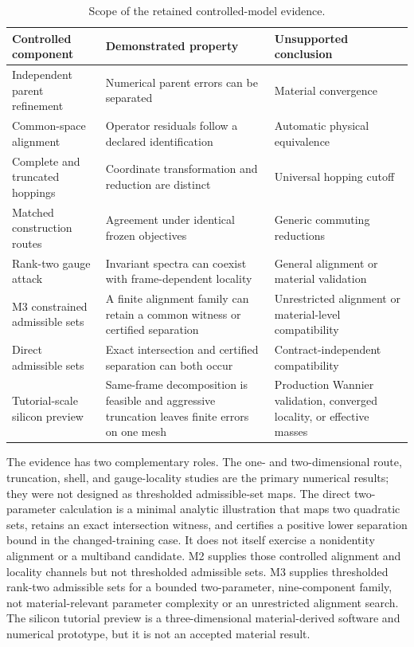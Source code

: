 \documentclass[preprint,12pt]{elsarticle}
\begin{document}
\begin{table}[t]
\centering
\caption{Scope of the retained controlled-model evidence.}
\label{tab:evidence-scope}
\begin{tabular}{@{}
>{\raggedright\arraybackslash}p{}
>{\raggedright\arraybackslash}p{}
>{\raggedright\arraybackslash}p{}@{}}
\toprule
Controlled component & Demonstrated property & Unsupported conclusion \\
\midrule
Independent parent refinement
& Numerical parent errors can be separated
& Material convergence \\
Common-space alignment
& Operator residuals follow a declared identification
& Automatic physical equivalence \\
Complete and truncated hoppings
& Coordinate transformation and reduction are distinct
& Universal hopping cutoff \\
Matched construction routes
& Agreement under identical frozen objectives
& Generic commuting reductions \\
Rank-two gauge attack
& Invariant spectra can coexist with frame-dependent locality
& General alignment or material validation \\
M3 constrained admissible sets
& A finite alignment family can retain a common witness or certified separation
& Unrestricted alignment or material-level compatibility \\
Direct admissible sets
& Exact intersection and certified separation can both occur
& Contract-independent compatibility \\
Tutorial-scale silicon preview
& Same-frame decomposition is feasible and aggressive truncation leaves finite errors on one mesh
& Production Wannier validation, converged locality, or effective masses \\
\bottomrule
\end{tabular}
\end{table}

The evidence has two complementary roles. The one- and two-dimensional route,
truncation, shell, and gauge-locality studies are the primary numerical results;
they were not designed as thresholded admissible-set maps. The direct
two-parameter calculation is a minimal analytic illustration that maps two
quadratic sets, retains an exact intersection witness, and certifies a positive
lower separation bound in the changed-training case. It does not itself exercise a
nonidentity alignment or a multiband candidate. M2 supplies those controlled
alignment and locality channels but not thresholded admissible sets. M3
supplies thresholded rank-two admissible sets for a bounded two-parameter,
nine-component family, not material-relevant parameter complexity or an
unrestricted alignment search. The silicon tutorial preview is a
three-dimensional material-derived software and numerical prototype, but it is
not an accepted material result.
\end{document}
